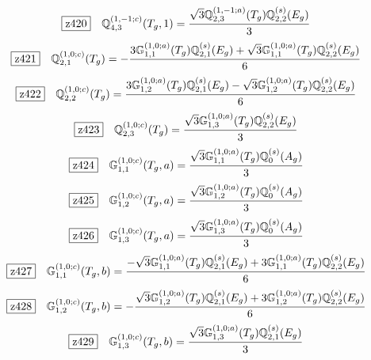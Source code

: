 \documentclass[fleqn,10pt,landscape]{jsarticle}
\begin{document}
\begin{dmath*}
\hspace*{3mm}\fbox{z420}\quad \mathbb{Q}_{4,3}^{(1,-1;c)}(T_{g},1)=\frac{\sqrt{3} \mathbb{Q}_{2,3}^{(1,-1;a)}(T_{g}) \mathbb{Q}_{2,2}^{(s)}(E_{g})}{3}
\end{dmath*}
\begin{dmath*}
\hspace*{3mm}\fbox{z421}\quad \mathbb{Q}_{2,1}^{(1,0;c)}(T_{g})=- \frac{3 \mathbb{G}_{1,1}^{(1,0;a)}(T_{g}) \mathbb{Q}_{2,1}^{(s)}(E_{g}) + \sqrt{3} \mathbb{G}_{1,1}^{(1,0;a)}(T_{g}) \mathbb{Q}_{2,2}^{(s)}(E_{g})}{6}
\end{dmath*}
\begin{dmath*}
\hspace*{3mm}\fbox{z422}\quad \mathbb{Q}_{2,2}^{(1,0;c)}(T_{g})=\frac{3 \mathbb{G}_{1,2}^{(1,0;a)}(T_{g}) \mathbb{Q}_{2,1}^{(s)}(E_{g}) - \sqrt{3} \mathbb{G}_{1,2}^{(1,0;a)}(T_{g}) \mathbb{Q}_{2,2}^{(s)}(E_{g})}{6}
\end{dmath*}
\begin{dmath*}
\hspace*{3mm}\fbox{z423}\quad \mathbb{Q}_{2,3}^{(1,0;c)}(T_{g})=\frac{\sqrt{3} \mathbb{G}_{1,3}^{(1,0;a)}(T_{g}) \mathbb{Q}_{2,2}^{(s)}(E_{g})}{3}
\end{dmath*}
\begin{dmath*}
\hspace*{3mm}\fbox{z424}\quad \mathbb{G}_{1,1}^{(1,0;c)}(T_{g},a)=\frac{\sqrt{3} \mathbb{G}_{1,1}^{(1,0;a)}(T_{g}) \mathbb{Q}_{0}^{(s)}(A_{g})}{3}
\end{dmath*}
\begin{dmath*}
\hspace*{3mm}\fbox{z425}\quad \mathbb{G}_{1,2}^{(1,0;c)}(T_{g},a)=\frac{\sqrt{3} \mathbb{G}_{1,2}^{(1,0;a)}(T_{g}) \mathbb{Q}_{0}^{(s)}(A_{g})}{3}
\end{dmath*}
\begin{dmath*}
\hspace*{3mm}\fbox{z426}\quad \mathbb{G}_{1,3}^{(1,0;c)}(T_{g},a)=\frac{\sqrt{3} \mathbb{G}_{1,3}^{(1,0;a)}(T_{g}) \mathbb{Q}_{0}^{(s)}(A_{g})}{3}
\end{dmath*}
\begin{dmath*}
\hspace*{3mm}\fbox{z427}\quad \mathbb{G}_{1,1}^{(1,0;c)}(T_{g},b)=\frac{- \sqrt{3} \mathbb{G}_{1,1}^{(1,0;a)}(T_{g}) \mathbb{Q}_{2,1}^{(s)}(E_{g}) + 3 \mathbb{G}_{1,1}^{(1,0;a)}(T_{g}) \mathbb{Q}_{2,2}^{(s)}(E_{g})}{6}
\end{dmath*}
\begin{dmath*}
\hspace*{3mm}\fbox{z428}\quad \mathbb{G}_{1,2}^{(1,0;c)}(T_{g},b)=- \frac{\sqrt{3} \mathbb{G}_{1,2}^{(1,0;a)}(T_{g}) \mathbb{Q}_{2,1}^{(s)}(E_{g}) + 3 \mathbb{G}_{1,2}^{(1,0;a)}(T_{g}) \mathbb{Q}_{2,2}^{(s)}(E_{g})}{6}
\end{dmath*}
\begin{dmath*}
\hspace*{3mm}\fbox{z429}\quad \mathbb{G}_{1,3}^{(1,0;c)}(T_{g},b)=\frac{\sqrt{3} \mathbb{G}_{1,3}^{(1,0;a)}(T_{g}) \mathbb{Q}_{2,1}^{(s)}(E_{g})}{3}
\end{dmath*}
\vspace{5mm}
\end{document}

